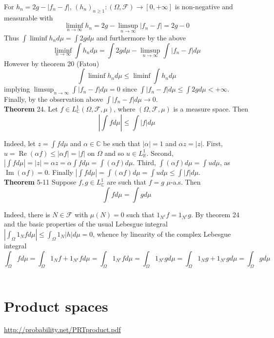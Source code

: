 \documentclass[a4paper]{article}
\newcommand{\clo}[1]{\left [ #1 \right ]}
\newcommand{\brac}[1]{\left ( #1 \right )}
\newcommand{\abs}[1]{\left | #1 \right |}
\newcommand{\Real}{\mathbb{R}}
\newcommand{\Zinf}{\clo{ 0, +\infty }}
\newcommand{\Cplx}{\mathbb{C}}
\newcommand{\Fcal}{\mathcal{F}}
\newcommand{\re}{\operatorname{Re}\nolimits}
\newcommand{\im}{\operatorname{Im}\nolimits}
\begin{document}
For $h_n = 2 g - \abs{f_n - f}$, $\brac{h_n}_{n \geq 1}:\brac{\Omega, \Fcal}\to \Zinf$ is non-negative and measurable with \[\liminf_{n\to \infty} h_n = 2 g - \limsup_{n\to \infty} \abs{f_n - f} = 2 g - 0\] Thus $\int \liminf h_n d\mu = \int 2g d\mu$ and furthermore by the above \[\liminf_{n\to \infty} \int h_n d\mu = \int 2 g d\mu - \limsup_{n\to \infty} \int \abs{f_n - f} d\mu\] However by theorem 20 (Fatou) \[\int \liminf h_n d\mu \leq \liminf \int h_n d\mu\] implying $\limsup_{n\to \infty} \int \abs{f_n - f} d\mu=0$ since $\int \abs{f_n - f} d\mu\leq \int 2g d\mu < +\infty$. Finally, by the observation above $\int \abs{f_n - f} d\mu \to 0$.\\

\label{thm:int_modulus} \noindent \textbf{Theorem} 24.
Let $f\in L^1_\Cplx\brac{\Omega, \Fcal, \mu}$, where $\brac{\Omega, \Fcal, \mu}$ is a measure space. Then \[\abs{ \int f d\mu }\leq \int \abs{f} d\mu\]

Indeed, let $z = \int f d\mu$ and $\alpha\in \Cplx$ be such that $\abs{\alpha} = 1$ and $\alpha z = \abs{z}$. First, $u = \re\brac{\alpha f} \leq \abs{\alpha f} = \abs{f}$ on $\Omega$ and so $u \in L^1_\Real$. Second, $\abs{\int f d\mu} = \abs{z} = \alpha z = \alpha \int f d\mu = \int \brac{\alpha f} d\mu$. Third, $\int \brac{\alpha f} d\mu = \int u d\mu$, as $\im\brac{\alpha f} = 0$. Finally $\abs{\int f d\mu} = \int \brac{\alpha f} d\mu = \int u d\mu \leq \int \abs{f} d\mu$.\\

\label{thm:int_mu_as} \noindent \textbf{Theorem} 5-11
Suppose $f,g\in L^1_\Cplx$ are such that $f=g$ $\mu$-a.s. Then \[\int f d\mu = \int g d\mu\]

Indeed, there is $N\in \Fcal$ with $\mu\brac{N}=0$ such that $1_{N^c} f = 1_{N^c} g$. By theorem 24 and the basic properties of the usual Lebesgue integral $\abs{\int_\Omega 1_N f d\mu}\leq \int_\Omega 1_N \abs{h}d\mu = 0$, whence by linearity of the complex Lebesgue integral \[\int_\Omega f d\mu = \int_\Omega 1_N f + 1_{N^c}f d\mu = \int_\Omega 1_{N^c}f d\mu = \int_\Omega 1_{N^c}g d\mu = \int_\Omega 1_N g + 1_{N^c}g d\mu = \int_\Omega g d\mu\]\\


\section{Product spaces} %
\label{sec:tut_6}
\url{http://probability.net/PRTproduct.pdf}
\end{document}
